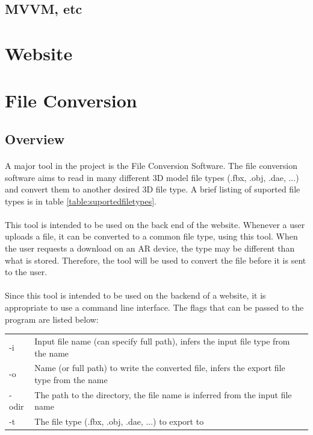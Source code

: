  \subsection{MVVM, etc}

 \section{Website}

 \section{File Conversion}

    \subsection{Overview}
    \paragraph{}
    A major tool in the project is the File Conversion Software.  
    The file conversion software aims to read in many different 3D model file types (.fbx, .obj, .dae, ...) and convert them to another desired 3D file type.  
    A brief listing of suported file types is in table \ref{table:suportedfiletypes}.

    \paragraph{}
    This tool is intended to be used on the back end of the website.  Whenever a user uploads a file, it can be converted to a common file type, using this tool.
    When the user requests a download on an AR device, the type may be different than what is stored.  Therefore, the tool will be used to convert the file before
    it is sent to the user.

    \paragraph{}
    Since this tool is intended to be used on the backend of a website, it is appropriate to use a command line interface.  
    The flags that can be passed to the program are listed below:

    \begin{table}[h]
        \centering
        \begin{tabular}{l  l}
            -i & Input file name (can specify full path), infers the input file type from the name \\
            -o & Name (or full path) to write the converted file, infers the export file type from the name \\
            -odir & The path to the directory, the file name is inferred from the input file name \\
            -t & The file type (.fbx, .obj, .dae, ...) to export to
        \end{tabular}
    \end{table}


